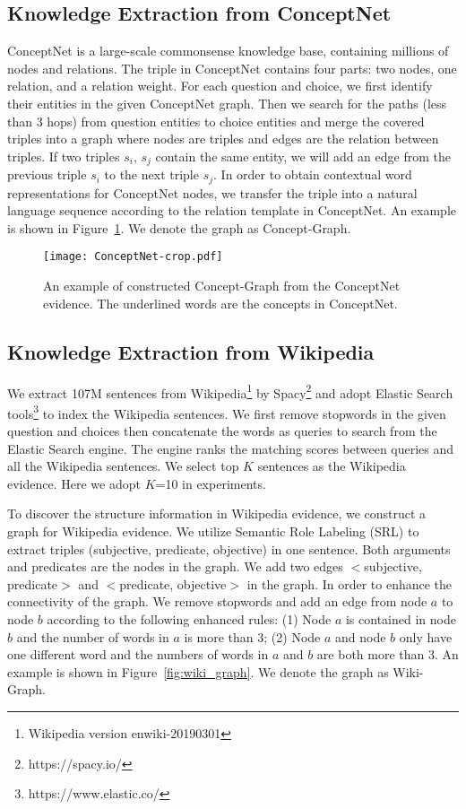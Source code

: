 \documentclass[letterpaper]{article} \usepackage{aaai20}  \usepackage{times}  \usepackage{helvet} \usepackage{courier}  \usepackage[hyphens]{url}  \usepackage{graphicx} \urlstyle{rm} \def\UrlFont{\rm}  \usepackage{graphicx}  \frenchspacing  \setlength{\pdfpagewidth}{8.5in}  \setlength{\pdfpageheight}{11in}
\begin{document}
\subsection{Knowledge Extraction from ConceptNet}
ConceptNet is a large-scale commonsense knowledge base, containing millions of nodes and relations.  The triple in ConceptNet contains four parts: two nodes, one relation, and a relation weight. 
For each question and choice, we first identify their entities in the given ConceptNet graph. Then we search for the paths (less than 3  hops) from question entities to choice entities and merge the covered triples into a graph where nodes are triples and edges are the relation between triples.  If two triples $s_i$, $s_j$ contain the same entity, we will add an edge from the previous triple $s_i$ to the next triple $s_j$. In order to obtain contextual word representations for ConceptNet nodes, we transfer the triple into a natural language sequence according to the relation template in ConceptNet. 
An example is shown in Figure~\ref{fig:concept_graph}.  We denote the graph as Concept-Graph.


\begin{figure}[htbp]
	\centering
	\texttt{[image: ConceptNet-crop.pdf]}
	\caption{An example of constructed Concept-Graph from the ConceptNet evidence. The underlined words are the concepts in ConceptNet.}
	\label{fig:concept_graph}
\end{figure}

\subsection{Knowledge Extraction from Wikipedia}
We extract 107M sentences from Wikipedia\footnote{Wikipedia version enwiki-20190301} by Spacy\footnote{https://spacy.io/} and adopt Elastic Search tools\footnote{https://www.elastic.co/} to index the Wikipedia sentences. We first remove stopwords in the given question and choices then concatenate the words as queries to search from the Elastic Search engine. The engine ranks the matching scores between queries and all the Wikipedia sentences. We select top $K$  sentences as the Wikipedia evidence. Here we adopt $K$=10 in experiments.

To discover the structure information in Wikipedia evidence, we construct a graph for Wikipedia evidence. We utilize Semantic Role Labeling (SRL) to extract triples (subjective, predicate, objective) in one sentence. Both arguments and predicates are the nodes in the graph. We add two edges $<$subjective, predicate$>$ and $<$predicate, objective$>$ in the graph. In order to enhance the  connectivity of the graph. We remove stopwords and add an edge from node $a$ to node $b$ according to the following enhanced rules: (1) Node $a$ is contained in node $b$ and the number of words in $a$ is more than 3;  (2) Node $a$ and node $b$ only have one different word and the numbers of words in $a$ and $b$ are both more than 3. An example is shown in Figure~\ref{fig:wiki_graph}. We denote the  graph as Wiki-Graph.
\end{document}
